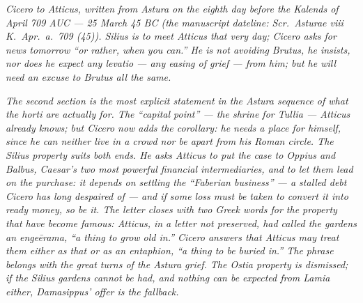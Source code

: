 
\textit{Cicero to Atticus, written from Astura on the
eighth day before the Kalends of April 709 AUC ---
25 March 45 BC (the manuscript dateline: \textit{Scr.\
Asturae viii K.\ Apr.\ a.\ 709 (45)}). Silius is to
meet Atticus that very day; Cicero asks for news
tomorrow ``or rather, when you can.'' He is not
avoiding Brutus, he insists, nor does he expect any
\textit{levatio} --- any easing of grief --- from him;
but he will need an excuse to Brutus all the same.}

\textit{The second section is the most explicit
statement in the Astura sequence of what the
\textit{horti} are actually for. The ``capital point''
--- the shrine for Tullia --- Atticus already knows;
but Cicero now adds the corollary: he needs a place
for himself, since he can neither live in a crowd nor
be apart from his Roman circle. The Silius property
suits both ends. He asks Atticus to put the case to
Oppius and Balbus, Caesar's two most powerful
financial intermediaries, and to let them lead on the
purchase: it depends on settling the ``Faberian
business'' --- a stalled debt Cicero has long despaired
of --- and if some loss must be taken to convert it
into ready money, so be it. The letter closes with
two Greek words for the property that have become
famous: Atticus, in a letter not preserved, had called
the gardens an \textit{enge\=erama}, ``a thing to grow
old in.'' Cicero answers that Atticus may treat them
either as that or as an \textit{entaphion}, ``a thing
to be buried in.'' The phrase belongs with the great
turns of the Astura grief. The Ostia property is
dismissed; if the Silius gardens cannot be had, and
nothing can be expected from Lamia either, Damasippus'
offer is the fallback.}
